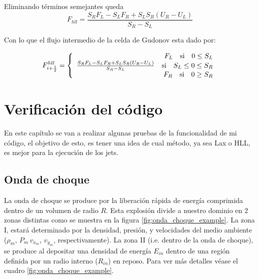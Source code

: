 \documentclass[12pt,a4paper]{book}
\begin{document}
Eliminando términos semejantes queda
\begin{equation}
F_{hll} = \frac{S_R F_L -S_L F_R + S_L S_R \left(U_R-U_L \right)}{S_R -S_L}
\end{equation}

Con lo que el flujo intermedio de la celda de Gudonov esta dado por:

\begin{equation}
F_{i+\frac{1}{2}}^{hll} = 
\left\lbrace
\begin{array}{rr}
F_L \quad \textup{si} \quad 0 \leq S_L  \\
\frac{S_R F_L -S_L F_R + S_L S_R \left(U_R-U_L \right)}{S_R -S_L} \quad \textup{si} \quad S_L \leq 0 \leq S_R \\
F_R \quad \textup{si} \quad  0 \geq  S_R
\end{array}
\right.
\end{equation}



\chapter{Verificación del código}

En este capítulo se van a realizar algunas pruebas de la funcionalidad de mi código, el objetivo de esto, es tener una idea de cual método, ya sea Lax o HLL, es mejor para la ejecución de los jets.

\section{Onda de choque} %
La onda de choque se produce por la liberación rápida de energía comprimida dentro de un volumen de radio $R$. Esta explosión divide a nuestro dominio en 2 zonas distintas como se muestra en la figura \ref{fig:onda_choque_example}. La zona I, estará determinado por la densidad, presión, y velocidades del medio ambiente ($\rho_m, \, P_m\, v_{x_m}, \, v_{y_m}$, respectivamente). La zona II (i.e. dentro de la onda de choque), se produce al depositar una densidad de energía $E_{in}$ dentro de una región definida por un radio interno ($R_{in}$) en reposo. Para ver más detalles véase el cuadro \ref{fig:onda_choque_example}.
\end{document}
